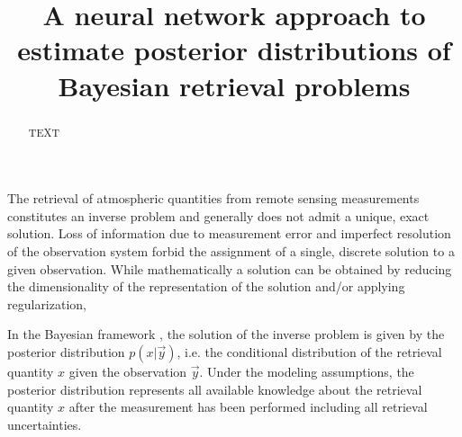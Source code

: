 \documentclass[journal abbreviation, manuscript]{copernicus}
\begin{document}
\title{A neural network approach to estimate posterior distributions of Bayesian retrieval problems}












\received{}
\pubdiscuss{} %
\revised{}
\accepted{}
\published{}




\maketitle



\begin{abstract}
TEXT
\end{abstract}




\introduction  %

The retrieval of atmospheric quantities from remote sensing measurements
constitutes an inverse problem and generally does not admit a unique, exact
solution. Loss of information due to measurement error and imperfect resolution
of the observation system forbid the assignment of a single, discrete solution
to a given observation. While mathematically a solution can be obtained
by reducing the dimensionality of the representation of the solution and/or
applying regularization,

 In the Bayesian framework \citep{rodgers}, the solution of the inverse
problem is given by the posterior distribution $p(x | \vec{y})$, i.e. the conditional
distribution of the retrieval quantity $x$ given the observation $\vec{y}$.
Under the modeling assumptions, the posterior distribution represents all
available knowledge about the retrieval quantity $x$ after the measurement has
been performed including all retrieval uncertainties.
\end{document}
